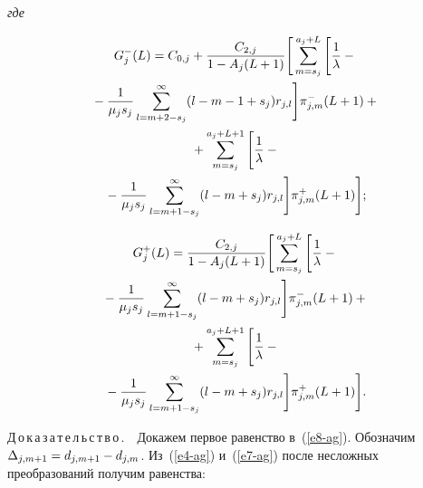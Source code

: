 \begin{multicols}{2}
  \noindent
    \textit{где} 
  
  \vspace*{-12pt}
  
  \noindent
  \begin{multline*}
  G_j^-(L) =C_{0,j}+ \fr{C_{2,j}}{1-A_j(L+1)}\Bigg[ \sum\limits_{m=s_j}^{a_j+L} 
\Bigg[ \fr{1}{\lambda} -{}\\
{}- \fr{1}{\mu_j s_j} \sum\limits^\infty_{l=m+2-s_j} (l-m-1+s_j) 
r_{j,l}\Bigg] \pi^-_{j,m}(L+1)+{}\\
  {}+
  \sum\limits_{m=s_j}^{a_j+L+1} \Bigg[ \fr{1}{\lambda} -{}\\
  {}- \fr{1}{\mu_j s_j} 
\sum\limits^\infty_{l=m+1-s_j} (l-m+s_j) r_{j,l}\Bigg] \pi^+_{j,m}(L+1)\Bigg];
    \end{multline*}
  
  \vspace*{-12pt}
  
  \noindent
  \begin{multline*}
  G_j^+(L)=  \fr{C_{2,j}}{1-A_j(L+1)} \Bigg[ \sum\limits_{m=s_j}^{a_j+L} \Bigg[ 
\fr{1}{\lambda}-{}\\
{}-\fr{1}{\mu_j s_j} \sum\limits^\infty_{l=m+1-s_j} (l-m+s_j) 
r_{j,l}\Bigg] \pi^-_{j,m}(L+1)+{}\\
  {}+\sum\limits_{m=s_j}^{a_j+L+1} \Bigg[ \fr{1}{\lambda}-{}\\
  {}-\fr{1}{\mu_j s_j} 
\sum\limits^\infty_{l=m+1-s_j} (l-m+s_j) r_{j,l} \Bigg] \pi^+_{j,m}(L+1)\Bigg].
  \end{multline*}
  
  \noindent
  Д\,о\,к\,а\,з\,а\,т\,е\,л\,ь\,с\,т\,в\,о\,.\ \  Докажем первое равенство 
в~(\ref{e8-ag}). Обозначим $\Delta_{j,m+1}\hm= d_{j, m+1} \hm- d_{j,m}$. 
Из~(\ref{e4-ag}) и~(\ref{e7-ag}) после не\-слож\-ных преобразований получим  
ра\-вен\-ства: 

\vspace*{-4pt}


\end{multicols}
